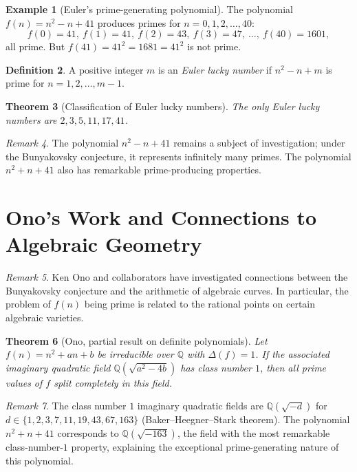 \documentclass[12pt,a4paper]{amsart}
\newtheorem{theorem}{Theorem}[section]
\theoremstyle{definition}
\newtheorem{definition}[theorem]{Definition}
\newtheorem{example}[theorem]{Example}
\theoremstyle{remark}
\newtheorem{remark}[theorem]{Remark}
\newcommand{\Q}{\mathbb{Q}}
\begin{document}
\begin{example}[Euler's prime-generating polynomial]
The polynomial $f(n) = n^2 - n + 41$ produces primes for
$n = 0, 1, 2, \ldots, 40$:
\[
  f(0) = 41,\ f(1) = 41,\ f(2) = 43,\ f(3) = 47,\ \ldots,\ f(40) = 1601,
\]
all prime.
But $f(41) = 41^2 = 1681 = 41^2$ is not prime.
\end{example}

\begin{definition}
A positive integer $m$ is an \emph{Euler lucky number} if
$n^2 - n + m$ is prime for $n = 1, 2, \ldots, m-1$.
\end{definition}

\begin{theorem}[Classification of Euler lucky numbers]
The only Euler lucky numbers are $2, 3, 5, 11, 17, 41$.
\end{theorem}

\begin{remark}
The polynomial $n^2 - n + 41$ remains a subject of investigation;
under the Bunyakovsky conjecture, it represents infinitely many primes.
The polynomial $n^2 + n + 41$ also has remarkable prime-producing properties.
\end{remark}

\section{Ono's Work and Connections to Algebraic Geometry}

\begin{remark}
Ken Ono and collaborators have investigated connections between the
Bunyakovsky conjecture and the arithmetic of algebraic curves.
In particular, the problem of $f(n)$ being prime is related to the
rational points on certain algebraic varieties.
\end{remark}

\begin{theorem}[Ono, partial result on definite polynomials]
Let $f(n) = n^2 + an + b$ be irreducible over $\Q$ with $\Delta(f) = 1$.
If the associated imaginary quadratic field $\Q(\sqrt{a^2 - 4b})$ has
class number $1$, then all prime values of $f$ split completely in this field.
\end{theorem}

\begin{remark}
The class number $1$ imaginary quadratic fields are
$\Q(\sqrt{-d})$ for $d \in \{1, 2, 3, 7, 11, 19, 43, 67, 163\}$
(Baker--Heegner--Stark theorem).
The polynomial $n^2 + n + 41$ corresponds to $\Q(\sqrt{-163})$, the field with
the most remarkable class-number-$1$ property, explaining the exceptional
prime-generating nature of this polynomial.
\end{remark}
\end{document}
